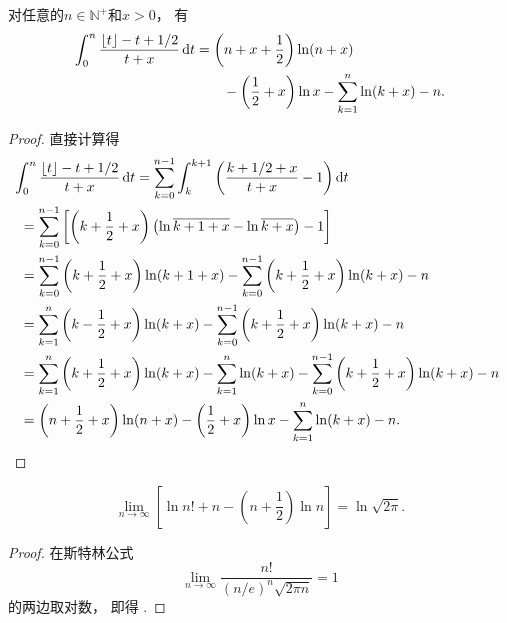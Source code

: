 \begin{lemma}\label{theorem:定积分.伽马函数的斯特灵近似.引理3}
对任意的\(n\in\mathbb{N}^+\)和\(x>0\)，
有\begin{equation}\label{equation:定积分.伽马函数的斯特灵近似.引理3}
	\begin{split}
		\int_0^n \frac{\lfloor t\rfloor - t + 1/2}{t + x} \dd{t}
		&= \left(n+x+\frac{1}{2}\right) \ln(n+x) \\
		&\hspace{20pt}
		- \left(\frac{1}{2}+x\right) \ln x
		- \sum_{k=1}^n \ln(k+x) - n.
	\end{split}
\end{equation}
\begin{proof}
直接计算得\begin{align*}
	&\hspace{-5pt}
		\int_0^n \frac{\lfloor t\rfloor - t + 1/2}{t + x} \dd{t}
		= \sum_{k=0}^{n-1} \int_k^{k+1} \left(
			\frac{k + 1/2 + x}{t + x} - 1
		\right) \dd{t} \\
	&= \sum_{k=0}^{n-1} \left[
			\left(k + \frac{1}{2} + x\right)
			\left(\ln\overline{k+1+x} - \ln\overline{k+x}\right)
			- 1
		\right] \\
	&= \sum_{k=0}^{n-1} \left(k + \frac{1}{2} + x\right) \ln(k+1+x)
		- \sum_{k=0}^{n-1} \left(k + \frac{1}{2} + x\right) \ln(k+x)
		- n \\
	&= \sum_{k=1}^n \left(k - \frac{1}{2} + x\right) \ln(k+x)
		- \sum_{k=0}^{n-1} \left(k + \frac{1}{2} + x\right) \ln(k+x)
		- n \\
	&= \sum_{k=1}^n \left(k + \frac{1}{2} + x\right) \ln(k+x)
		- \sum_{k=1}^n \ln(k+x)
		- \sum_{k=0}^{n-1} \left(k + \frac{1}{2} + x\right) \ln(k+x)
		- n \\
	&= \left(n + \frac{1}{2} + x\right) \ln(n+x)
		- \left(\frac{1}{2} + x\right) \ln x
		- \sum_{k=1}^n \ln(k+x)
		- n.
	\qedhere
\end{align*}
\end{proof}
\end{lemma}

\begin{lemma}\label{theorem:定积分.伽马函数的斯特灵近似.引理4}
\begin{equation}\label{equation:定积分.伽马函数的斯特灵近似.引理4}
	\lim_{n\to\infty} \left[
		\ln n! + n - \left(n+\frac{1}{2}\right) \ln n
	\right]
	= \ln\sqrt{2\pi}.
\end{equation}
\begin{proof}
在斯特林公式\[
	\lim_{n\to\infty} \frac{n!}{(n/e)^n \sqrt{2\pi n}} = 1
\]的两边取对数，
即得 .
\end{proof}
\end{lemma}

